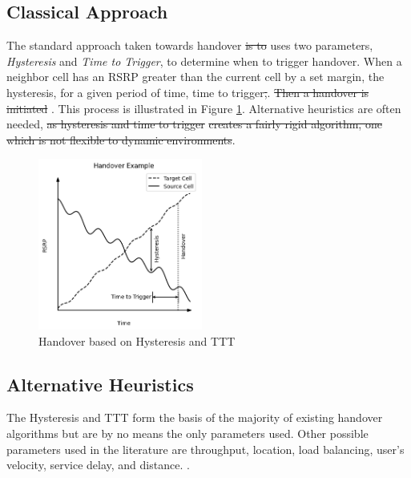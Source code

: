\subsection{Classical Approach}

The standard approach taken towards handover \st{is to} uses two parameters, \textit{Hysteresis} and \textit{Time to Trigger}, to determine when to trigger handover. When a neighbor cell has an RSRP greater than the current cell by a set margin,  the hysteresis, for a given period of time,  time to trigger\st{,}. \st{Then a handover is initiated} . This process is illustrated in Figure \ref{fig:hysteresis_handover}. Alternative heuristics are often needed, \st{as hysteresis and time to trigger}  \st{creates a fairly rigid algorithm, one which is not flexible to dynamic environments}.

\begin{figure}
    \includegraphics[width=0.48\textwidth]{hysteresis_ttt.png}
    \caption{Handover based on Hysteresis and TTT}
    \label{fig:hysteresis_handover}
\end{figure}


\subsection{Alternative Heuristics}
The Hysteresis and TTT  form the basis of the majority of existing handover algorithms but are by no means the only parameters used. Other possible parameters used in the literature are throughput, location, load balancing, user’s velocity, service delay, and distance. \cite{nyangaresi_efficient_2022}. 

